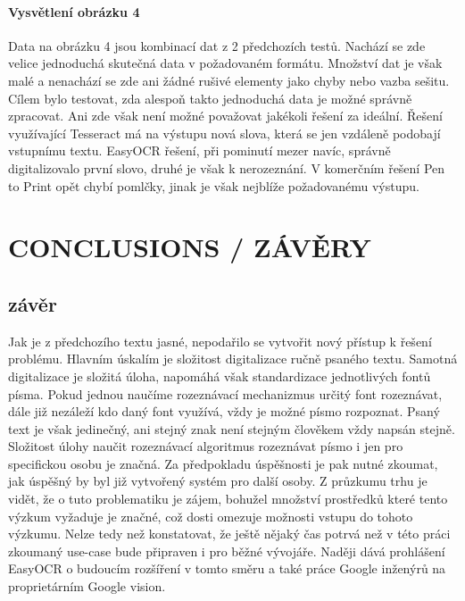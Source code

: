 \documentclass[journal]{IEEEtran}
\begin{document}
\paragraph{Vysvětlení obrázku 4}
Data na obrázku 4 jsou kombinací dat z 2 předchozích testů.
Nachází se zde velice jednoduchá skutečná data v požadovaném formátu.
Množství dat je však malé a nenachází se zde ani žádné rušivé elementy jako chyby nebo vazba sešitu.
Cílem bylo testovat, zda alespoň takto jednoduchá data je možné správně zpracovat.
Ani zde však není možné považovat jakékoli řešení za ideální.
Řešení využívající Tesseract má na výstupu nová slova, která se jen vzdáleně podobají vstupnímu textu.
EasyOCR řešení, při pominutí mezer navíc, správně digitalizovalo první slovo,  druhé je však k nerozeznání.
V komerčním řešení Pen to Print opět chybí pomlčky, jinak je však nejblíže požadovanému výstupu.


\section{CONCLUSIONS / ZÁVĚRY}
\subsection{závěr}
Jak je z předchozího textu jasné, nepodařilo se vytvořit nový přístup k řešení problému.
Hlavním úskalím je složitost digitalizace ručně psaného textu.
Samotná digitalizace je složitá úloha, napomáhá však standardizace jednotlivých fontů písma.
Pokud jednou naučíme rozeznávací mechanizmus určitý font rozeznávat, dále již nezáleží kdo daný font využívá, vždy je možné písmo rozpoznat.
Psaný text je však jedinečný, ani stejný znak není stejným člověkem vždy napsán stejně.
Složitost úlohy naučit rozeznávací algoritmus rozeznávat písmo i jen pro specifickou osobu je značná.
Za předpokladu úspěšnosti je pak nutné zkoumat, jak úspěšný by byl již vytvořený systém pro další osoby.
Z průzkumu trhu je vidět, že o tuto problematiku je zájem, bohužel množství prostředků které tento výzkum vyžaduje je značné, což dosti omezuje možnosti vstupu do tohoto výzkumu.
Nelze tedy než konstatovat, že ještě nějaký čas potrvá než v této práci zkoumaný use-case bude připraven i pro běžné vývojáře.
Naději dává prohlášení EasyOCR o budoucím rozšíření v tomto směru a také práce Google inženýrů na proprietárním Google vision.



\printbibliography

\printacronyms


\end{document}
